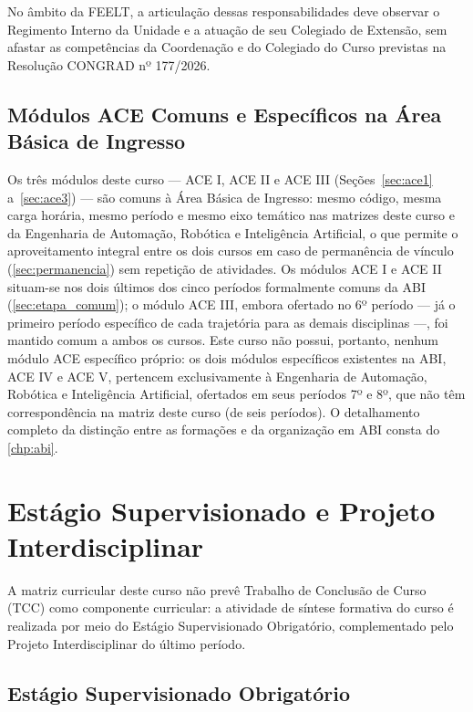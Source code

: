 No âmbito da FEELT, a articulação dessas responsabilidades deve observar o Regimento Interno da Unidade e a atuação de seu Colegiado de Extensão, sem afastar as competências da Coordenação e do Colegiado do Curso previstas na Resolução CONGRAD nº 177/2026.

\subsection{Módulos ACE Comuns e Específicos na Área Básica de Ingresso}
\label{sec:ace_abi}

Os três módulos deste curso — ACE I, ACE II e ACE III (Seções~\ref{sec:ace1} a~\ref{sec:ace3}) — são comuns à Área Básica de Ingresso: mesmo código, mesma carga horária, mesmo período e mesmo eixo temático nas matrizes deste curso e da Engenharia de Automação, Robótica e Inteligência Artificial, o que permite o aproveitamento integral entre os dois cursos em caso de permanência de vínculo (\autoref{sec:permanencia}\unskip) sem repetição de atividades. Os módulos ACE I e ACE II situam-se nos dois últimos dos cinco períodos formalmente comuns da ABI (\autoref{sec:etapa_comum}); o módulo ACE III, embora ofertado no 6º período — já o primeiro período específico de cada trajetória para as demais disciplinas —, foi mantido comum a ambos os cursos. Este curso não possui, portanto, nenhum módulo ACE específico próprio: os dois módulos específicos existentes na ABI, ACE IV e ACE V, pertencem exclusivamente à Engenharia de Automação, Robótica e Inteligência Artificial, ofertados em seus períodos 7º e 8º, que não têm correspondência na matriz deste curso (de seis períodos). O detalhamento completo da distinção entre as formações e da organização em ABI consta do \autoref{chp:abi}.

\section{Estágio Supervisionado e Projeto Interdisciplinar}
\label{sec:acc_conclusao}

A matriz curricular deste curso não prevê Trabalho de Conclusão de Curso (TCC) como componente curricular: a atividade de síntese formativa do curso é realizada por meio do Estágio Supervisionado Obrigatório, complementado pelo Projeto Interdisciplinar do último período.

\subsection{Estágio Supervisionado Obrigatório}

